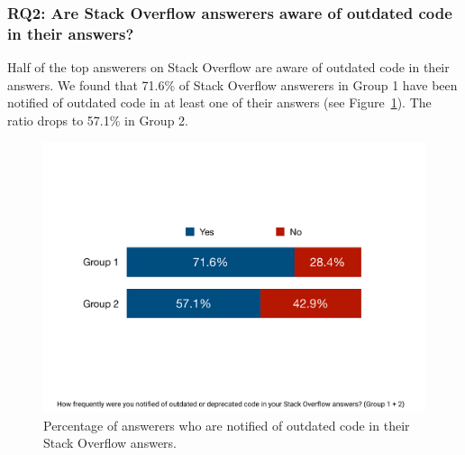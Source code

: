 \documentclass{svjour3}                     %
\begin{document}
\vspace{0.5cm} \noindent{}
\vspace{0.5cm}

\subsubsection*{RQ2: Are Stack Overflow answerers aware of outdated code in their answers?}

Half of the top answerers on Stack Overflow
are aware of outdated code in their answers. We found that 71.6\% of Stack Overflow answerers in Group 1 have been notified of
outdated code in at least one of their answers (see Figure~\ref{fig:survey_outdated}). The ratio drops to 57.1\% in
Group 2. 

\begin{figure}
	\centering
	\includegraphics[width=.5\linewidth]{survey_outdated}
	\caption{Percentage of answerers who are notified of outdated code in their Stack Overflow answers.}
	\label{fig:survey_outdated}
\end{figure}
\end{document}
